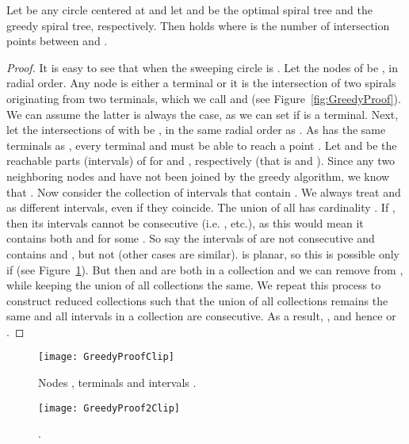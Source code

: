 \documentclass{journalA4}
\begin{document}
\begin{lemma}
\label{lem:greedycircleisects} Let  be any circle centered at  and let  and  be the optimal spiral tree and the greedy spiral tree, respectively. Then  holds where  is the number of intersection points between  and .
\end{lemma}
\begin{proof}
It is easy to see that  when the sweeping circle is . Let the nodes of  be , in radial order. Any node  is either a terminal or it is the intersection of two spirals originating from two terminals, which we call  and  (see
Figure~\ref{fig:GreedyProof}). We can assume the latter is always the case, as we can set  if  is a terminal. Next, let the intersections of  with
 be , in the same radial order as . As  has the same terminals as , every terminal  and  must be able to reach a point . Let
 and  be the reachable parts (intervals) of  for  and , respectively (that is  and ). Since any two neighboring nodes  and  have not been joined by the greedy algorithm, we know that . Now consider the
collection  of intervals that contain . We always treat  and  as different intervals, even if they coincide. The union of all  has cardinality . If , then its intervals cannot be
consecutive (i.e. , etc.), as this would mean it contains both  and  for some . So say the intervals of  are not consecutive and  contains 
and , but not  (other cases are similar).  is planar, so this is possible only if  (see Figure~\ref{fig:GreedyProof2}). But then
 and  are both in a collection  and we can remove  from , while keeping the union of all collections the same. We repeat this process to construct reduced collections  such
that the union of all collections remains the same and all intervals in a collection  are consecutive. As a result, , and hence 
or .
\end{proof}

\begin{figure}[t]
  \centering
  \begin{minipage}[t]{.6\textwidth}
  \centering
  \texttt{[image: GreedyProofClip]}
  \caption{Nodes , terminals  and intervals .}
  \label{fig:GreedyProof}
  \end{minipage}
  \hfill
  \begin{minipage}[t]{.35\textwidth}
  \centering
  \texttt{[image: GreedyProof2Clip]}
  \caption{.}
  \label{fig:GreedyProof2}
  \end{minipage}
\end{figure}
\end{document}
